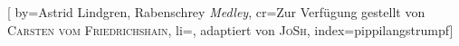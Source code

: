 
[%
    by={Astrid Lindgren, Rabenschrey \textit{Medley}},
    cr={Zur Verf\"{u}gung gestellt von \textsc{Carsten vom Friedrichshain}},
    li={, adaptiert von \textsc{JoSh}},
    index={pippilangstrumpf}]


    \label{pippilangstrumpf}

    \begin{center}
    \end{center}

